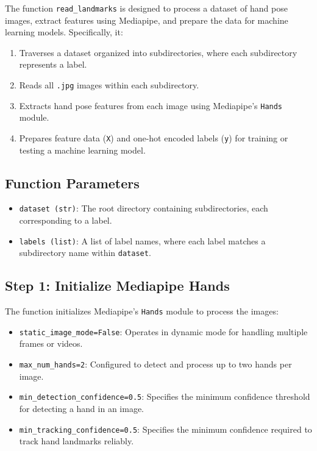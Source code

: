 The function \texttt{read\_landmarks} is designed to process a dataset of hand pose images, extract features using Mediapipe, and prepare the data for machine learning models. Specifically, it:
\begin{enumerate}
	\item Traverses a dataset organized into subdirectories, where each subdirectory represents a label.
	\item Reads all \texttt{.jpg} images within each subdirectory.
	\item Extracts hand pose features from each image using Mediapipe's \texttt{Hands} module.
	\item Prepares feature data (\texttt{X}) and one-hot encoded labels (\texttt{y}) for training or testing a machine learning model.
\end{enumerate}

\subsection{Function Parameters}
\begin{itemize}
	\item \texttt{dataset (str)}: The root directory containing subdirectories, each corresponding to a label.
	\item \texttt{labels (list)}: A list of label names, where each label matches a subdirectory name within \texttt{dataset}.
\end{itemize}

\subsection*{Step 1: Initialize Mediapipe Hands}
The function initializes Mediapipe's \texttt{Hands} module to process the images:
\begin{itemize}
	\item \texttt{static\_image\_mode=False}: Operates in dynamic mode for handling multiple frames or videos.
	\item \texttt{max\_num\_hands=2}: Configured to detect and process up to two hands per image.
	\item \texttt{min\_detection\_confidence=0.5}: Specifies the minimum confidence threshold for detecting a hand in an image.
	\item \texttt{min\_tracking\_confidence=0.5}: Specifies the minimum confidence required to track hand landmarks reliably.
\end{itemize}

